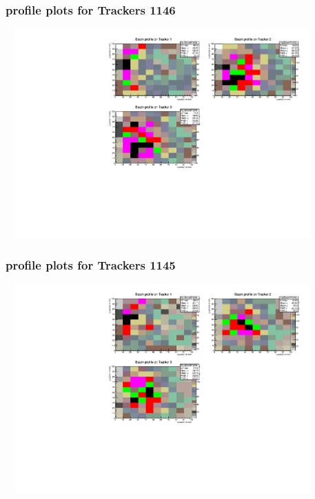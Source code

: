 \documentclass[slidestop,compress,mathserif]{beamer}
\begin{document}
\begin{frame}\frametitle{profile plots for Trackers 1146}
	 \includegraphics[width=12cm,height=8cm]{profile_plots_for_Trackers_1146.pdf}
\end{frame}
\begin{frame}\frametitle{profile plots for Trackers 1145}
	 \includegraphics[width=12cm,height=8cm]{profile_plots_for_Trackers_1145.pdf}
\end{frame}
\end{document}
